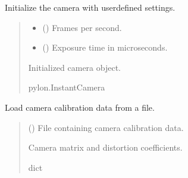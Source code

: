 \documentclass[letterpaper,10pt,english]{sphinxmanual}
\begin{document}
\begin{fulllineitems}
\label{\detokenize{PoseEstimator:PoseEstimator.camera_calibrator.initialize_camera}}
\pysigstartsignatures
{}
\pysigstopsignatures
\sphinxAtStartPar
Initialize the camera with user\sphinxhyphen{}defined settings.
\begin{quote}\begin{description}
\begin{itemize}
\item {} 
\sphinxAtStartPar
{} () \textendash{} Frames per second.

\item {} 
\sphinxAtStartPar
{} () \textendash{} Exposure time in microseconds.

\end{itemize}

\sphinxAtStartPar
Initialized camera object.

\sphinxAtStartPar
pylon.InstantCamera

\end{description}\end{quote}

\end{fulllineitems}


\begin{fulllineitems}
\label{\detokenize{PoseEstimator:PoseEstimator.camera_calibrator.load_calibration_data}}
\pysigstartsignatures
{}
\pysigstopsignatures
\sphinxAtStartPar
Load camera calibration data from a file.
\begin{quote}\begin{description}
\sphinxAtStartPar
{} () \textendash{} File containing camera calibration data.

\sphinxAtStartPar
Camera matrix and distortion coefficients.

\sphinxAtStartPar
dict

\end{description}\end{quote}

\end{fulllineitems}
\end{document}
